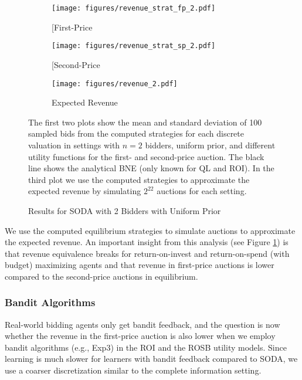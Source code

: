 \documentclass{article}
\begin{document}
\begin{figure}[h]
	\begin{center}
	\begin{subfigure}{0.32\textwidth}
		\centering
		\texttt{[image: figures/revenue\_strat\_fp\_2.pdf]}
		\caption{[First-Price}
	\end{subfigure}
	\begin{subfigure}{0.32\textwidth}
		\centering
		\texttt{[image: figures/revenue\_strat\_sp\_2.pdf]}
		\caption{[Second-Price}
	\end{subfigure}
	\begin{subfigure}{0.32\textwidth}
		\centering
		\texttt{[image: figures/revenue\_2.pdf]}
		\caption{Expected Revenue}
	\end{subfigure}
	\caption{Results for SODA with 2 Bidders with Uniform Prior }
	\label{fig:soda}
	\end{center}
	\footnotesize 
	The first two plots show the mean and standard deviation of 100 sampled bids from the computed strategies for each discrete valuation in settings with $n=2$ bidders, uniform prior, and different utility functions for the first- and second-price auction. The black line shows the analytical BNE (only known for QL and ROI). In the third plot we use the computed strategies to approximate the expected revenue by simulating $2^{22}$ auctions for each setting.
\end{figure}

We use the computed equilibrium strategies to simulate auctions to approximate the expected revenue.
An important insight from this analysis (see Figure \ref{fig:soda}) is that revenue equivalence breaks for return-on-invest and return-on-spend (with budget) maximizing agents and that revenue in first-price auctions is lower compared to the second-price auctions in equilibrium.

\subsubsection{Bandit Algorithms} \label{sec:bandit_bayesian}
Real-world bidding agents only get bandit feedback, and the question is now whether the revenue in the first-price auction is also lower when we employ bandit algorithms (e.g., Exp3) in the ROI and the ROSB utility models. Since learning is much slower for learners with bandit feedback compared to SODA, we use a coarser discretization similar to the complete information setting.
\end{document}
